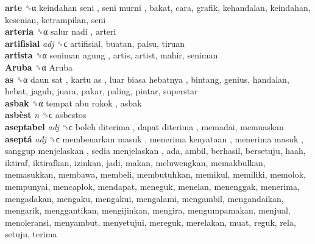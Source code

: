 \textbf{arte} ␝α   keindahan seni ,  seni murni , bakat, cara, grafik, kehandalan, keindahan, kesenian, ketrampilan, seni  \\
\textbf{arteria} ␝α   salur nadi , arteri  \\
\textbf{artifisial} \emph{adj}  ␝ϲ  artifisial, buatan, palsu, tiruan  \\
\textbf{artista} ␝α   seniman agung , artis, artist, mahir, seniman  \\
\textbf{Aruba} ␝α   Aruba   \\
\textbf{as} ␝α   daun sat ,  kartu as ,  luar biasa hebatnya , bintang, genius, handalan, hebat, jaguh, juara, pakar, paling, pintar, superstar  \\
\textbf{asbak} ␝α   tempat abu rokok , asbak  \\
\textbf{asbèst} \emph{n}  ␝ϲ  asbestos  \\
\textbf{aseptabel} \emph{adj}  ␝ϲ   boleh diterima ,  dapat diterima , memadai, memuaskan  \\
\textbf{aseptá} \emph{adj}  ␝ϲ   membenarkan masuk ,  menerima kenyataan ,  menerima masuk ,  sanggup menjelaskan ,  sedia menjelaskan , ada, ambil, berhasil, bersetuju, haah, iktiraf, iktirafkan, izinkan, jadi, makan, meluwengkan, memakbulkan, memasukkan, membawa, membeli, membutuhkan, memikul, memiliki, memolok, mempunyai, mencaplok, mendapat, meneguk, menelan, menenggak, menerima, mengadakan, mengaku, mengakui, mengalami, mengambil, mengandaikan, mengarik, menggantikan, mengijinkan, mengira, mengumpamakan, menjual, menoleransi, menyambut, menyetujui, mereguk, merelakan, muat, reguk, rela, setuju, terima  \\

